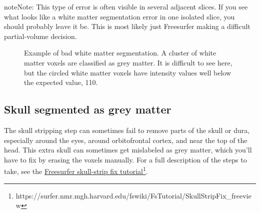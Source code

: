 \documentclass[letterpaper,10pt,openany,oneside]{sphinxmanual}
\begin{document}
\begin{notice}{note}{Note:}
This type of error is often visible in several adjacent slices. If
you see what looks like a white matter segmentation error in one isolated
slice, you should probably leave it be. This is most likely just Freesurfer
making a difficult partial-volume decision.
\end{notice}
\begin{figure}[htbp]
\centering
\capstart

\caption{Example of bad white matter segmentation. A cluster of white matter voxels
are classified as grey matter. It is difficult to see here, but the circled
white matter voxels have intensity values well below the expected value,
110.}\end{figure}


\subsection{Skull segmented as grey matter}
\label{surface_reconstruction:skull-segmented-as-grey-matter}
The skull stripping step can sometimes fail to remove parts of the skull or
dura, especially around the eyes, around orbitofrontal cortex, and near the top
of the head. This extra skull can sometimes get mislabeled as grey matter,
which you'll have to fix by erasing the voxels manually. For a full description
of the steps to take, see the \href{https://surfer.nmr.mgh.harvard.edu/fswiki/FsTutorial/SkullStripFix\_freeview}{Freesurfer skull-strip fix tutorial}\footnote{https://surfer.nmr.mgh.harvard.edu/fswiki/FsTutorial/SkullStripFix\_freeview}.
\end{document}
